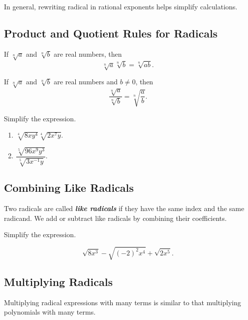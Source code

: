 In general, rewriting radical in rational exponents helps simplify
calculations.

\hypertarget{product-and-quotient-rules-for-radicals}{%
\subsection{Product and Quotient Rules for
Radicals}\label{product-and-quotient-rules-for-radicals}}

If \(\sqrt[n]{a}\) and \(\sqrt[n]{b}\) are real numbers, then
\[{\sqrt[n]a}{\sqrt[n]b}=\sqrt[n]{ab}.\]

If \(\sqrt[n]a\) and \(\sqrt[n]b\) are real numbers and \(b\neq 0\),
then \[\dfrac{\sqrt[n]a}{\sqrt[n]b}=\sqrt[n]{\dfrac ab}.\]

\begin{example}
  Simplify the expression.
  
  \begin{enumerate}
  \item
    \(\sqrt[4]{8xy^4}\sqrt[4]{2x^7y}\).
  \item
    \(\dfrac{\sqrt[5]{96x^9y^3}}{\sqrt[5]{3x^{-1}y}}\).
  \end{enumerate}
\end{example}

\hypertarget{combining-like-radicals}{%
\subsection{Combining Like Radicals}\label{combining-like-radicals}}

Two radicals are called \textbf{\emph{like radicals}} if they have the
same index and the same radicand. We add or subtract like radicals by
combining their coefficients.

\begin{example}
  Simplify the expression.
  
  \[
  \sqrt{8x^3}-\sqrt{(-2)^2 x^4}+\sqrt{2x^5}.
  \]
\end{example}
\vspace*{4\baselineskip}

\hypertarget{multiplying-radicals}{%
\subsection{Multiplying Radicals}\label{multiplying-radicals}}

Multiplying radical expressions with many terms is similar to that
multiplying polynomials with many terms.

